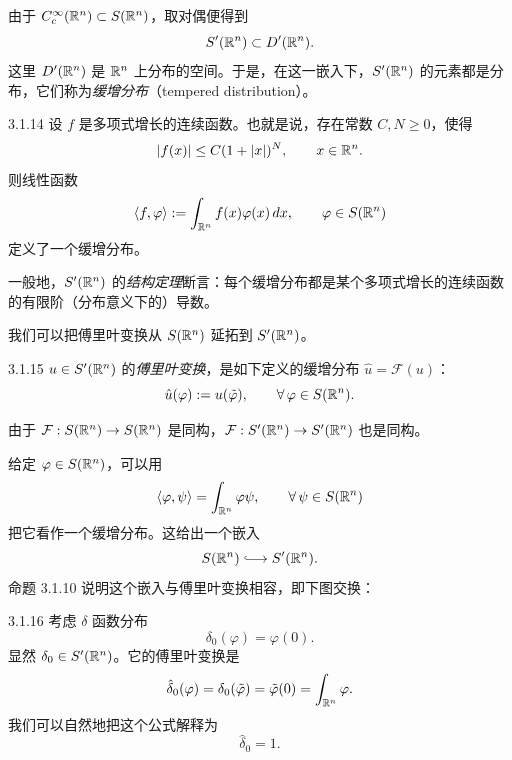 
由于 $C_c^\infty(\mathbb{R}^n)\subset S(\mathbb{R}^n)$，取对偶便得到
\[
S'(\mathbb{R}^n)\subset D'(\mathbb{R}^n).
\]
这里 $D'(\mathbb{R}^n)$ 是 $\mathbb{R}^n$ 上分布的空间。于是，在这一嵌入下，$S'(\mathbb{R}^n)$ 的元素都是分布，它们称为\emph{缓增分布}（tempered distribution）。

\begin{example}{3.1.14}
设 $f$ 是多项式增长的连续函数。也就是说，存在常数 $C,N\ge0$，使得
\[
|f(x)|\le C(1+|x|)^N,\qquad x\in\mathbb{R}^n.
\]
则线性函数
\[
\langle f,\varphi\rangle:=\int_{\mathbb{R}^n}f(x)\varphi(x)\,dx,\qquad\varphi\in S(\mathbb{R}^n)
\]
定义了一个缓增分布。
\end{example}

一般地，$S'(\mathbb{R}^n)$ 的\emph{结构定理}断言：每个缓增分布都是某个多项式增长的连续函数的有限阶（分布意义下的）导数。

我们可以把傅里叶变换从 $S(\mathbb{R}^n)$ 延拓到 $S'(\mathbb{R}^n)$。

\begin{definition}{3.1.15}
$u\in S'(\mathbb{R}^n)$ 的\emph{傅里叶变换}，是如下定义的缓增分布 $\hat u=\mathcal{F}(u)$：
\[
\hat u(\varphi):=u(\tilde\varphi),\qquad\forall\,\varphi\in S(\mathbb{R}^n).
\]
\end{definition}

由于 $\mathcal{F}:S(\mathbb{R}^n)\to S(\mathbb{R}^n)$ 是同构，$\mathcal{F}:S'(\mathbb{R}^n)\to S'(\mathbb{R}^n)$ 也是同构。

给定 $\varphi\in S(\mathbb{R}^n)$，可以用
\[
\langle\varphi,\psi\rangle=\int_{\mathbb{R}^n}\varphi\psi,\qquad\forall\,\psi\in S(\mathbb{R}^n)
\]
把它看作一个缓增分布。这给出一个嵌入
\[
S(\R^n)\lhook\joinrel\longrightarrow S'(\R^n).
\]
命题 3.1.10 说明这个嵌入与傅里叶变换相容，即下图交换：
\begin{center}
\end{center}

\begin{example}{3.1.16}
考虑 $\delta$ 函数分布
\[
\delta_0(\varphi)=\varphi(0).
\]
显然 $\delta_0\in S'(\mathbb{R}^n)$。它的傅里叶变换是
\[
\hat\delta_0(\varphi)=\delta_0(\tilde\varphi)=\tilde\varphi(0)=\int_{\mathbb{R}^n}\varphi.
\]
我们可以自然地把这个公式解释为
\[
\hat\delta_0=1.
\]
\end{example}

